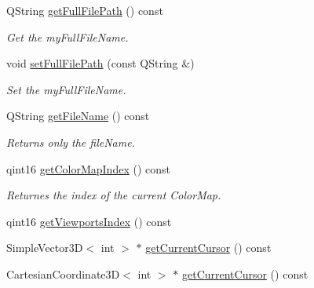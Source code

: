 \begin{DoxyCompactItemize}
Q\+String \mbox{\hyperlink{classScreen__manager_a35fad2826491912a33af8f6b5192abc4}{get\+Full\+File\+Path}} () const
\begin{DoxyCompactList}\small\item\em Get the my\+Full\+File\+Name. \end{DoxyCompactList}\item 
\mbox{\label{classScreen__manager_acb7b0f59376ccbc2038b832bba22b577}} 
void \mbox{\hyperlink{classScreen__manager_acb7b0f59376ccbc2038b832bba22b577}{set\+Full\+File\+Path}} (const Q\+String \&)
\begin{DoxyCompactList}\small\item\em Set the my\+Full\+File\+Name. \end{DoxyCompactList}\item 
\mbox{\label{classScreen__manager_ab773fd2975a54a2baaeb441b2644607d}} 
Q\+String \mbox{\hyperlink{classScreen__manager_ab773fd2975a54a2baaeb441b2644607d}{get\+File\+Name}} () const
\begin{DoxyCompactList}\small\item\em Returns only the file\+Name. \end{DoxyCompactList}\item 
\mbox{\label{classScreen__manager_a44503ee6f24482b8d01797503b0d88a8}} 
qint16 \mbox{\hyperlink{classScreen__manager_a44503ee6f24482b8d01797503b0d88a8}{get\+Color\+Map\+Index}} () const
\begin{DoxyCompactList}\small\item\em Returnes the index of the current Color\+Map. \end{DoxyCompactList}\item 
\mbox{\label{classScreen__manager_aec8c672544208e60368172e662de815e}} 
qint16 \mbox{\hyperlink{classScreen__manager_aec8c672544208e60368172e662de815e}{get\+Viewports\+Index}} () const
\item 
Simple\+Vector3D$<$ int $>$ $\ast$ \mbox{\hyperlink{classScreen__manager_a86a2c051954195c03f8718f4e371c221}{get\+Current\+Cursor}} () const
\item 
Cartesian\+Coordinate3D$<$ int $>$ $\ast$ \mbox{\hyperlink{classScreen__manager_a9cb3da1f84299ee2c32e4032e7e19ed1}{get\+Current\+Cursor}} () const
\item 
\mbox{\label{classScreen__manager_a6c41fbe3b06a11879010f8cce4488953}} 

\end{DoxyCompactItemize}
